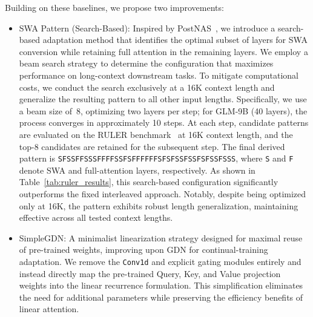 \documentclass{article}
\theoremstyle{definition}
\begin{document}
\noindent Building on these baselines, we propose two improvements:

\begin{itemize}[leftmargin=1.5em,itemsep=2pt]
    \item {SWA Pattern (Search-Based):} Inspired by PostNAS~\cite{gu2025jet}, we introduce a search-based adaptation method that identifies the optimal subset of layers for SWA conversion while retaining full attention in the remaining layers. We employ a beam search strategy to determine the configuration that maximizes performance on long-context downstream tasks. To mitigate computational costs, we conduct the search exclusively at a 16K context length and generalize the resulting pattern to all other input lengths. Specifically, we use a beam size of~8, optimizing two layers per step; for GLM-9B (40 layers), the process converges in approximately 10 steps. At each step, candidate patterns are evaluated on the RULER benchmark~\cite{hsiehruler} at 16K context length, and the top-8 candidates are retained for the subsequent step. The final derived pattern is \texttt{SFSSFFSSSFFFFSSFSFFFFFFSFSFSSFSSFSFSSFSSS}, where \texttt{S} and \texttt{F} denote SWA and full-attention layers, respectively. As shown in Table~\ref{tab:ruler_results}, this search-based configuration significantly outperforms the fixed interleaved approach. Notably, despite being optimized only at 16K, the pattern exhibits robust length generalization, maintaining effective across all tested context lengths.

    \item {SimpleGDN:} A minimalist linearization strategy designed for maximal reuse of pre-trained weights, improving upon GDN for continual-training adaptation. We remove the \texttt{Conv1d} and explicit gating modules entirely and instead directly map the pre-trained Query, Key, and Value projection weights into the linear recurrence formulation. This simplification eliminates the need for additional parameters while preserving the efficiency benefits of linear attention.
\end{itemize}
\end{document}
